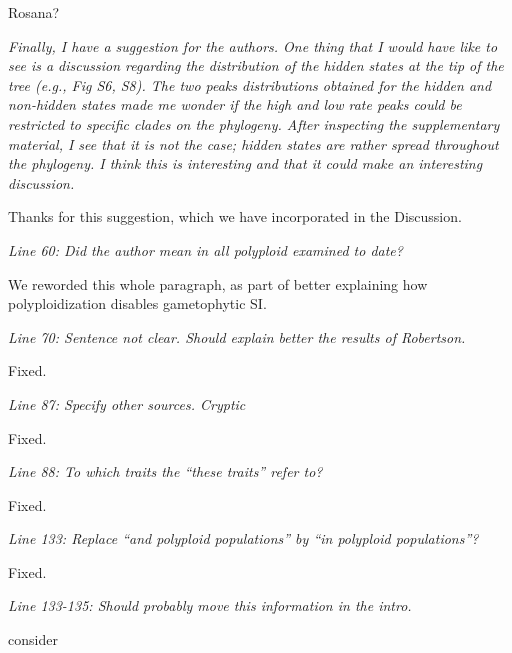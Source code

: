 \documentclass[11pt]{article}
\renewenvironment{quote}{\bigskip\noindent\itshape\ignorespaces}{\smallskip}
\begin{document}
Rosana? %

\begin{quote}
Finally, I have a suggestion for the authors.
One thing that I would have like to see is a discussion regarding the distribution of the hidden states at the tip of the tree (e.g., Fig S6, S8).
The two peaks distributions obtained for the hidden and non-hidden states made me wonder if the high and low rate peaks could be restricted to specific clades on the phylogeny.
After inspecting the supplementary material, I see that it is not the case; hidden states are rather spread throughout the phylogeny.
I think this is interesting and that it could make an interesting discussion.
\end{quote}

Thanks for this suggestion, which we have incorporated in the Discussion. %


\begin{quote}
Line 60: Did the author mean in all polyploid examined to date?
\end{quote}

We reworded this whole paragraph, as part of better explaining how polyploidization disables gametophytic SI.

\begin{quote}
Line 70: Sentence not clear. Should explain better the results of Robertson.
\end{quote}

Fixed.

\begin{quote}
Line 87: Specify other sources. Cryptic
\end{quote}

Fixed. %

\begin{quote}
Line 88: To which traits the ``these traits'' refer to?
\end{quote}

Fixed. %

\begin{quote}
Line 133: Replace ``and polyploid populations'' by ``in polyploid populations''?
\end{quote}

Fixed. %

\begin{quote}
Line 133-135: Should probably move this information in the intro.
\end{quote}

consider %
\end{document}

